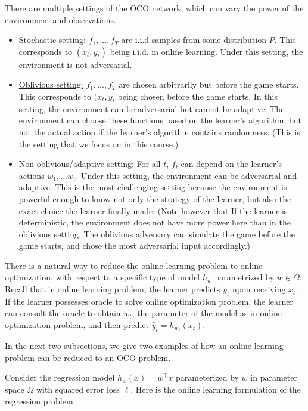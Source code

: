 There are multiple settings of the OCO network, which can vary the power of the environment and observations.

\begin{itemize}
    \item \underline{Stochastic setting:} $f_1,...,f_T$ are i.i.d samples from some distribution $P$. This corresponds to $(x_t, y_t)$ being i.i.d. in online learning. Under this setting, the environment is not adversarial.
    \item \underline{Oblivious setting:} $f_1,...,f_T$ are chosen arbitrarily but before the game starts. This corresponds to $(x_t, y_t$ being chosen before the game starts. In this setting, the environment can be adversarial but cannot be adaptive. The environment can choose these functions based on the learner's algorithm, but not the actual action if the learner's algorithm contains randomness. (This is the setting that we focus on in this course.)
    \item \underline{Non-oblivious/adaptive setting:} For all $t$, $f_t$ can depend on the learner's actions $w_1,...w_t$. Under this setting, the environment can be adversarial and adaptive. This is the most challenging setting because the environment is powerful enough to know not only the strategy of the learner, but also the exact choice the learner finally made. (Note however that If the learner is deterministic, the environment does not have more power here than in the oblivious setting. The oblivious adversary can simulate the game before the game starts, and chose the most adversarial input accordingly.)
\end{itemize}
 
There is a natural way to reduce the online learning problem to online optimization, with respect to a specific type of model $h_{w}$ parametrized by $w \in \Omega$. Recall that in online learning problem, the learner predicts $y_t$ upon receiving $x_t$. If the learner possesses oracle to solve online optimization problem, the learner can consult the oracle to obtain $w_t$, the parameter of the model as in online optimization problem, and then predict $\hat{y}_t = h_{w_t}(x_t)$.

In the next two subsections, we give two examples of how an online learning problem can be reduced to an OCO problem.
    

Consider the regression model $h_w(x) = w^\top x$ parameterized by $w$ in parameter space $\Omega$ with squared error loss $\ell$. Here is the online learning formulation of the regression problem:

